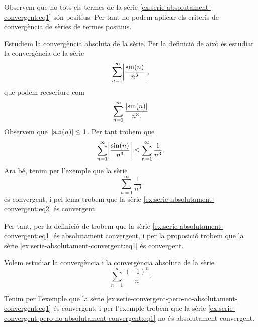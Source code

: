 \documentclass[../analisi-matematica.tex]{subfiles}
\begin{document}
    \begin{solution}
        Observem que no tots els termes de la sèrie \eqref{ex:serie-absolutament-convergent:eq1} són positius.
        Per tant no podem aplicar els criteris de convergència de sèries de termes positius.

        Estudiem la convergència absoluta de la sèrie.
        Per la definició de  això és estudiar la convergència de la sèrie
        \begin{equation}
            \label{ex:serie-absolutament-convergent:eq2}
            \sum_{n=1}^{\infty}\abs{\frac{\sin(n)}{n^{3}}},
        \end{equation}
        que podem reescriure com
        \[
            \sum_{n=1}^{\infty}\frac{\abs{\sin(n)}}{n^{3}.}
        \]
        Observem que~\(\abs{\sin(n)}\leq1\).
        Per tant trobem que
        \[
            \sum_{n=1}^{\infty}\abs{\frac{\sin(n)}{n^{3}}}\leq\sum_{n=1}^{\infty}\frac{1}{n^{3}}.
        \]
        Ara bé, tenim per l'exemple  que la sèrie
        \[
            \sum_{n=1}^{\infty}\frac{1}{n^{3}}
        \]
        és convergent, i pel lema  trobem que la sèrie \eqref{ex:serie-absolutament-convergent:eq2} és convergent.

        Per tant, per la definició de  trobem que la sèrie \eqref{ex:serie-absolutament-convergent:eq1} és absolutament convergent, i per la proposició  trobem que la sèrie \eqref{ex:serie-absolutament-convergent:eq1} és convergent.
    \end{solution}
    \begin{example} %
        \label{ex:serie-convergent-pero-no-absolutament-convergent}
        Volem estudiar la convergència i la convergència absoluta de la sèrie
        \begin{equation}
            \label{ex:serie-convergent-pero-no-absolutament-convergent:eq1}
            \sum_{n=1}^{\infty}\frac{(-1)^{n}}{n}.
        \end{equation}
    \end{example}
    \begin{solution}
        Tenim per l'exemple  que la sèrie \eqref{ex:serie-convergent-pero-no-absolutament-convergent:eq1} és convergent, i per l'exemple  trobem que la sèrie \eqref{ex:serie-convergent-pero-no-absolutament-convergent:eq1} no és absolutament convergent.
    \end{solution}
\end{document}
